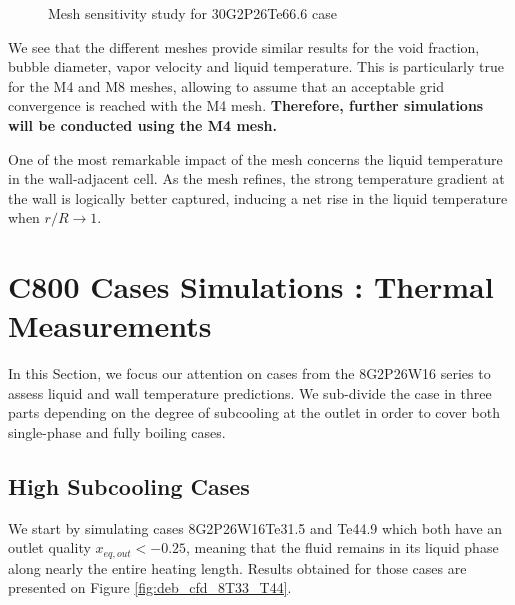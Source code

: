 \begin{figure}[!h]
{}
\caption{Mesh sensitivity study for 30G2P26Te66.6 case}
\label{fig:deb_cfd_msh_sensi}
\end{figure}


We see that the different meshes provide similar results for the void fraction, bubble diameter, vapor velocity and liquid temperature. This is particularly true for the M4 and M8 meshes, allowing to assume that an acceptable grid convergence is reached with the M4 mesh. \textbf{Therefore, further simulations will be conducted using the M4 mesh.}

\begin{remark*}
One of the most remarkable impact of the mesh concerns the liquid temperature in the wall-adjacent cell. As the mesh refines, the strong temperature gradient at the wall is logically better captured, inducing a net rise in the liquid temperature when $r/R \to 1$.
\end{remark*}



\section{C800 Cases Simulations : Thermal Measurements}

In this Section, we focus our attention on cases from the 8G2P26W16 series to assess liquid and wall temperature predictions. We sub-divide the case in three parts depending on the degree of subcooling at the outlet in order to cover both single-phase and fully boiling cases.



\subsection{High Subcooling Cases}

We start by simulating cases 8G2P26W16Te31.5 and Te44.9 which both have an outlet quality $x_{eq,out}<-0.25$, meaning that the fluid remains in its liquid phase along nearly the entire heating length. Results obtained for those cases are presented on Figure \ref{fig:deb_cfd_8T33_T44}.


